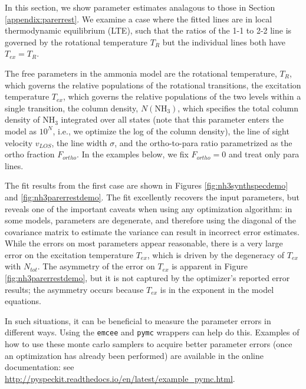 \documentclass[twocolumn]{aastex62}
\newcommand{\ammonia}{\ensuremath{\mathrm{NH}_3}\xspace}
\begin{document}
In this section, we show parameter estimates analagous to those in Section
\ref{appendix:parerrest}.
We examine a case where the fitted lines are in local
thermodynamic equilibrium (LTE), such that the ratios of the 1-1
to 2-2 line is governed by the rotational temperature $T_{R}$ but the individual
lines both have $T_{ex}=T_{R}$.

The free parameters in the ammonia model are
the rotational temperature, $T_{R}$, which governs the relative populations
of the rotational transitions, the excitation temperature $T_{ex}$, which governs
the relative populations of the two levels within a single transition,
the column density, $N(\ammonia)$, which specifies the total column density
of \ammonia integrated over all states (note that this parameter enters
the model as $10^N$, i.e., we optimize the log of the column density),
the line of sight velocity $v_{LOS}$, the line width $\sigma$, and the ortho-to-para
ratio parametrized as the ortho fraction $F_{ortho}$.  In the examples below,
we fix $F_{ortho}=0$ and treat only para lines.


The fit results from the first case are shown in Figures
\ref{fig:nh3synthspecdemo} and \ref{fig:nh3parerrestdemo}.  The fit excellently
recovers the input parameters, but reveals one of the important caveats when
using any optimization algorithm: in some models, parameters are degenerate,
and therefore using the diagonal of the covariance matrix to estimate the
variance can result in incorrect error estimates.  While the errors on most
parameters appear reasonable, there is a very large error on the excitation
temperature $T_{ex}$, which is driven by the degeneracy of $T_{ex}$ with
$N_{tot}$.  The asymmetry of the error on $T_{ex}$ is apparent in Figure
\ref{fig:nh3parerrestdemo}, but it is not captured by the optimizer's reported
error results; the asymmetry occurs because $T_{ex}$ is in the exponent in the
model equations.

In such situations, it can be beneficial to measure the parameter errors
in different ways.  Using the \texttt{emcee} and \texttt{pymc} wrappers
can help do this.  Examples of how to use these monte carlo samplers
to acquire better parameter errors (once an optimization has already
been performed) are available in the online documentation:
see \url{http://pyspeckit.readthedocs.io/en/latest/example_pymc.html}.
\end{document}
